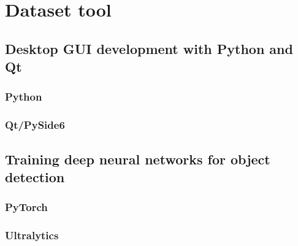 \chapter{Dataset tool}




\section{Desktop GUI development with Python and Qt}
\subsection{Python}
\subsection{Qt/PySide6}




\section{Training deep neural networks for object detection}
\subsection{PyTorch}
\subsection{Ultralytics}



% 